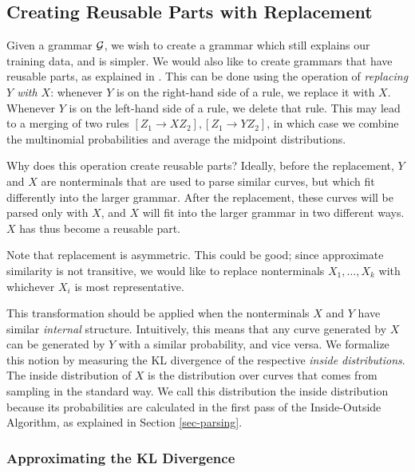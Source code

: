 \documentclass{article}
\begin{document}
\subsection{Creating Reusable Parts with Replacement}
\label{sec-replacement}

Given a grammar ${\mathcal G}$, we wish to create a grammar which still
explains our training data, and is simpler. We would also like to
create grammars that have reusable parts, as explained in
\cite{amit-bernstein}. This can be done using
the operation of \emph{replacing $Y$ with $X$}: whenever $Y$ is on the
right-hand side of a rule, we replace it with $X$. Whenever $Y$ is on
the left-hand side of a rule, we delete that rule. This may lead to a
merging of two rules $[Z_1 \to X Z_2], [Z_1 \to Y Z_2]$, in which case
we combine the multinomial probabilities and average the midpoint
distributions.

Why does this operation create reusable parts? Ideally, before the
replacement, $Y$ and $X$ are nonterminals that are used to parse
similar curves, but which fit differently into the larger
grammar. After the replacement, these curves will be parsed only with
$X$, and $X$ will fit into the larger grammar in two different
ways. $X$ has thus become a reusable part.

Note that replacement is asymmetric. This could be good; since
approximate similarity is not transitive, we would like to replace
nonterminals $X_1,\dots, X_k$ with whichever $X_i$ is most
representative.

This transformation should be applied when the nonterminals $X$ and
$Y$ have similar \emph{internal} structure. Intuitively, this means
that any curve generated by $X$ can be generated by $Y$ with a similar
probability, and vice versa. We formalize this notion by measuring the
KL divergence of the respective \emph{inside distributions}. The
inside distribution of $X$ is the distribution over curves that comes
from sampling in the standard way. We call this distribution the
inside distribution because its probabilities are calculated in the
first pass of the Inside-Outside Algorithm, as explained in Section
\ref{sec-parsing}.

\subsubsection{Approximating the KL Divergence}
\end{document}
